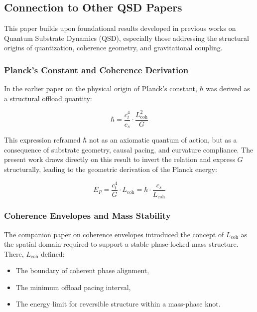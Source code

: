 \documentclass[entropy,article,submit,pdftex,moreauthors]{Definitions/mdpi}
\begin{document}
\section[\appendixname~\thesection]{}
\subsection[\appendixname~\thesubsection]{Connection to Other QSD Papers}

This paper builds upon foundational results developed in previous works on Quantum Substrate Dynamics (QSD), especially those addressing the structural origins of quantization, coherence geometry, and gravitational coupling.

\subsubsection{Planck’s Constant and Coherence Derivation}
In the earlier paper on the physical origin of Planck’s constant, $\hbar$ was derived as a structural offload quantity:

\begin{equation}
\hbar = \frac{c_t^4}{c_s} \cdot \frac{L_{\text{coh}}^2}{G}
\end{equation}

This expression reframed $\hbar$ not as an axiomatic quantum of action, but as a consequence of substrate geometry, causal pacing, and curvature compliance. The present work draws directly on this result to invert the relation and express $G$ structurally, leading to the geometric derivation of the Planck energy:

\begin{equation}
E_P = \frac{c_t^4}{G} \cdot L_{\text{coh}} = \hbar \cdot \frac{c_s}{L_{\text{coh}}}
\end{equation}

\subsubsection{Coherence Envelopes and Mass Stability}
The companion paper on coherence envelopes introduced the concept of $L_{\text{coh}}$ as the spatial domain required to support a stable phase-locked mass structure. There, $L_{\text{coh}}$ defined:
\begin{itemize}
  \item The boundary of coherent phase alignment,
  \item The minimum offload pacing interval,
  \item The energy limit for reversible structure within a mass-phase knot.
\end{itemize}
\end{document}
